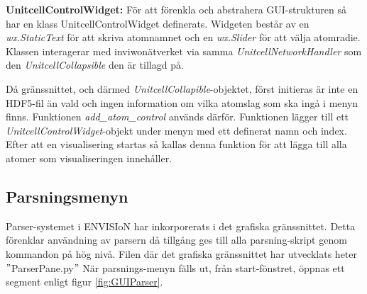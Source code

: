 \textbf{UnitcellControlWidget: } För att förenkla och abstrahera GUI-strukturen så har en klass UnitcellControlWidget definerats. Widgeten består av en \textit{wx.StaticText} för att skriva atomnamnet och en \textit{wx.Slider} för att välja atomradie. Klassen interagerar med inviwonätverket via samma \textit{UnitcellNetworkHandler} som den \textit{UnitcellCollapsible} den är tillagd på.


Då gränssnittet, och därmed \textit{UnitcellCollapible}-objektet, först initieras är inte en HDF5-fil än vald och ingen information om vilka atomslag som ska ingå i menyn finns. Funktionen \textit{add\_atom\_control} används därför. Funktionen lägger till ett \textit{UnitcellControlWidget}-objekt under menyn med ett definerat namn och index. Efter att en visualisering startas så kallas denna funktion för att lägga till alla atomer som visualiseringen innehåller.



\subsection{Parsningsmenyn}
Parser-systemet i ENVISIoN har inkorporerats i det grafiska gränssnittet. Detta förenklar användning av parsern då tillgång ges till alla parsning-skript genom kommandon på hög nivå. Filen där det grafiska gränssnittet har utvecklats heter $"$ParserPane.py$"$ När parsnings-menyn fälls ut, från start-fönstret, öppnas ett segment enligt figur \ref{fig:GUIParser}.

